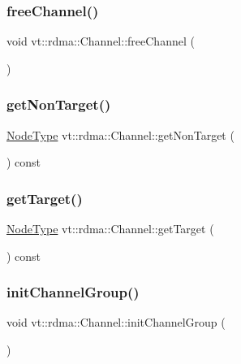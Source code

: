 \subsubsection{\texorpdfstring{free\+Channel()}{freeChannel()}}
{\footnotesize\ttfamily void vt\+::rdma\+::\+Channel\+::free\+Channel (\begin{DoxyParamCaption}{ }\end{DoxyParamCaption})}

\mbox{\label{structvt_1_1rdma_1_1_channel_ada79ff7c9444bae5dea0382e277f6b7d}} 
\subsubsection{\texorpdfstring{get\+Non\+Target()}{getNonTarget()}}
{\footnotesize\ttfamily \hyperlink{namespacevt_a866da9d0efc19c0a1ce79e9e492f47e2}{Node\+Type} vt\+::rdma\+::\+Channel\+::get\+Non\+Target (\begin{DoxyParamCaption}{ }\end{DoxyParamCaption}) const}

\mbox{\label{structvt_1_1rdma_1_1_channel_a2185f0c194fd626b0e617c8e706bf297}} 
\subsubsection{\texorpdfstring{get\+Target()}{getTarget()}}
{\footnotesize\ttfamily \hyperlink{namespacevt_a866da9d0efc19c0a1ce79e9e492f47e2}{Node\+Type} vt\+::rdma\+::\+Channel\+::get\+Target (\begin{DoxyParamCaption}{ }\end{DoxyParamCaption}) const}

\mbox{\label{structvt_1_1rdma_1_1_channel_a8b95715326b4f434ebe53c5577403b3b}} 
\subsubsection{\texorpdfstring{init\+Channel\+Group()}{initChannelGroup()}}
{\footnotesize\ttfamily void vt\+::rdma\+::\+Channel\+::init\+Channel\+Group (\begin{DoxyParamCaption}{ }\end{DoxyParamCaption})}

